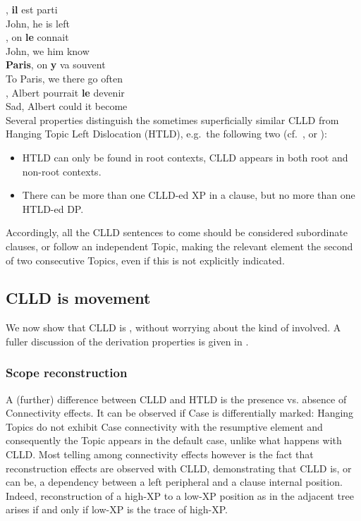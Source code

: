 \documentclass[output=paper]{langsci/langscibook}
\begin{document}
\ea
\ea
	, {\bf il} est parti\\
John, he is left\\
\ex
	, on  {\bf le} connait \\
John, we him know\\
\ex
	 {\bf Paris}, on  {\bf y} va souvent \\
To Paris, we there go often\\
\ex
	, Albert pourrait {\bf le} devenir \label{predle}\\
Sad, Albert could it become \\
\z
\z
%
Several properties distinguish the sometimes superficially similar
\gls{CLLD} from Hanging Topic Left Dislocation
(HTLD), e.g.\ the following two (cf.\ \citealp{AlexiadouLD}, or
\citealp{Krapova2008}):

\begin{itemize}
\item HTLD can only be found in root contexts, \gls{CLLD} appears in both root and non-root contexts.
\item There can be more than one \gls{CLLD}-ed XP in a clause, but no more than one HTLD-ed DP.
\end{itemize}
Accordingly, all the \gls{CLLD} sentences to come
should be considered subordinate clauses, or follow an independent Topic,
making the relevant element the second of two consecutive Topics, even if this
is not explicitly indicated.

\subsection{CLLD is movement}

We now show that \gls{CLLD} is , without
worrying about the kind of  involved. A fuller discussion of the
derivation properties is given in \cite{Angelopoulo2017}.

\subsubsection{Scope reconstruction}

A (further) difference between \gls{CLLD} and HTLD
is the presence vs. absence of Connectivity effects. It can be observed if Case
is differentially marked: Hanging Topics do not exhibit Case connectivity with
the resumptive element and consequently the Topic appears in the default case,
unlike what happens with CLLD. Most telling among connectivity effects however
is the fact that reconstruction effects are observed with CLLD,  demonstrating
that \gls{CLLD} is, or can be, a 
dependency between a left peripheral  and a clause internal position.
Indeed, reconstruction of a high-XP  to a low-XP position as in the adjacent
tree arises if and only if  low-XP is the trace of  high-XP.
\end{document}
